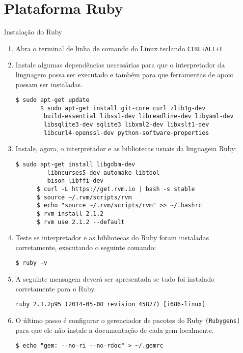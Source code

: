 \section{Plataforma Ruby}
\begin{frame}{Instalação do Ruby}
  \begin{enumerate}
    \item Abra o terminal de linha de comando do Linux teclando \verb!CTRL+ALT+T! 
    \item Instale algumas \alert{dependências} necessárias para que o interpretador da linguagem 
      possa ser executado e também para que ferramentas de apoio possam ser instaladas.  
    \begin{lstlisting}[style=BashInputStyle]
       $ sudo apt-get update 
       $ sudo apt-get install git-core curl zlib1g-dev 
	    build-essential libssl-dev libreadline-dev libyaml-dev 
	    libsqlite3-dev sqlite3 libxml2-dev libxslt1-dev 
	    libcurl4-openssl-dev python-software-properties
    \end{lstlisting}
    
    \framebreak
    \item Instale, agora, o interpretador e as bibliotecas usuais da linguagem Ruby:
    \begin{lstlisting}[style=BashInputStyle]
      $ sudo apt-get install libgdbm-dev 
	     libncurses5-dev automake libtool 
	     bison libffi-dev
      $ curl -L https://get.rvm.io | bash -s stable
      $ source ~/.rvm/scripts/rvm
      $ echo "source ~/.rvm/scripts/rvm" >> ~/.bashrc
      $ rvm install 2.1.2
      $ rvm use 2.1.2 --default
    \end{lstlisting}
    
    \item Teste se interpretador e as bibliotecas do Ruby foram instaladas corretamente, executando
      o seguinte comando:
    \begin{lstlisting}[style=BashInputStyle]
      $ ruby -v
    \end{lstlisting}
    
    \item A seguinte mensagem deverá ser apresentada se tudo foi instalado corretamente para
      o Ruby.
    \begin{lstlisting}[style=BashInputStyle]
      ruby 2.1.2p95 (2014-05-08 revision 45877) [i686-linux]
    \end{lstlisting}
    
    \item O último passo é configurar o gerenciador de pacotes do Ruby \verb!(Rubygens)! para
      que ele não instale a documentação de cada \alert{gem} localmente.
    \begin{lstlisting}[style=BashInputStyle]
      $ echo "gem: --no-ri --no-rdoc" > ~/.gemrc
    \end{lstlisting}
    
  \end{enumerate}
 
\end{frame}
